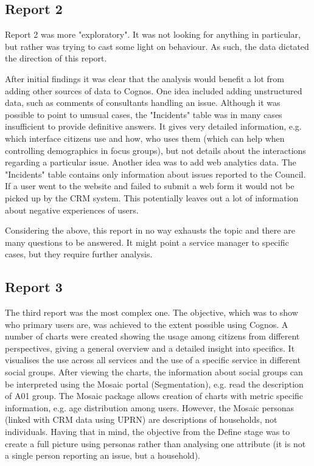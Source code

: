 		\subsection{Report 2}
		
Report 2 was more "exploratory". It was not looking for anything in particular, but rather was trying to cast some light on behaviour. As such, the data dictated the direction of this report.

After initial findings it was clear that the analysis would benefit a lot from adding other sources of data to Cognos. One idea included adding unstructured data, such as comments of consultants handling an issue. Although it was possible to point to unusual cases, the "Incidents" table was in many cases insufficient to provide definitive answers. It gives very detailed information, e.g. which interface citizens use and how, who uses them (which can help when controlling demographics in focus groups), but not details about the interactions regarding a particular issue. Another idea was to add web analytics data. The "Incidents" table contains only information about issues reported to the Council. If a user went to the website and failed to submit a web form it would not be picked up by the CRM system. This potentially leaves out a lot of information about negative experiences of users.

Considering the above, this report in no way exhausts the topic and there are many questions to be answered. It might point a service manager to specific cases, but they require further analysis.
		
		\subsection{Report 3}
		
The third report was the most complex one. The objective, which was to show who primary users are, was achieved to the extent possible using Cognos. A number of charts were created showing the usage among citizens from different perspectives, giving a general overview and a detailed insight into specifics. It visualises the use across all services and the use of a specific service in different social groups. After viewing the charts, the information about social groups can be interpreted using the Mosaic portal (Segmentation), e.g. read the description of A01 group. The Mosaic package allows creation of charts with metric specific information, e.g. age distribution among users. However, the Mosaic personas (linked with CRM data using UPRN) are descriptions of households, not individuals. Having that in mind, the objective from the Define stage was to create a full picture using personas rather than analysing one attribute (it is not a single person reporting an issue, but a household).

